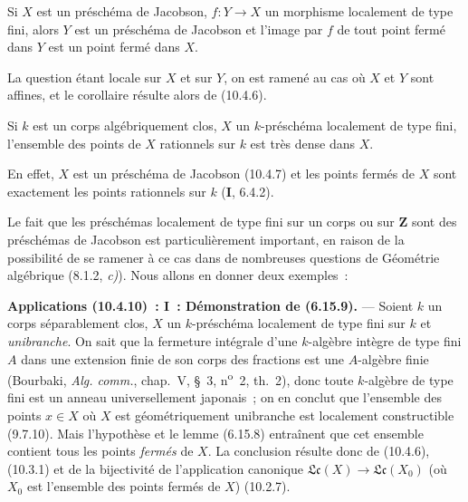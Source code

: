 \begin{corollary}[10.4.7]
\label{IV.10.4.7-fr}
Si $X$ est un préschéma de Jacobson, $f:Y\to X$ un morphisme localement de type
fini, alors $Y$ est un préschéma de Jacobson et l'image par $f$ de tout point
fermé dans $Y$ est un point fermé dans $X$.
\end{corollary}

La question étant locale sur $X$ et sur $Y$, on est ramené au cas où $X$ et
$Y$ sont affines, et le corollaire résulte alors de (10.4.6).

\begin{corollary}[10.4.8]
\label{IV.10.4.8-fr}
Si $k$ est un corps algébriquement clos, $X$ un $k$-préschéma localement de
type fini, l'ensemble des points de $X$ rationnels sur $k$ est très dense dans
$X$.
\end{corollary}

En effet, $X$ est un préschéma de Jacobson (10.4.7) et les points fermés de
$X$ sont exactement les points rationnels sur $k$ (\textbf{I}, 6.4.2).

\begin{env}[10.4.9]
\label{IV.10.4.9-fr}
Le fait que les préschémas localement de type fini sur un corps ou sur
$\mathbf Z$ sont des préschémas de Jacobson est particulièrement important,
en raison de la possibilité de se ramener à ce cas dans de nombreuses
questions de Géométrie algébrique (8.1.2, \emph{c)}). Nous allons en donner
deux exemples~:
\end{env}

\begin{env}[10.4.10]
\label{IV.10.4.10-fr}
\textbf{Applications (10.4.10)~: I~: Démonstration de (6.15.9).} --- Soient
$k$ un corps séparablement clos, $X$ un $k$-préschéma localement de type fini
sur $k$ et \emph{unibranche}. On sait que la fermeture intégrale d'une
$k$-algèbre intègre de type fini $A$ dans une extension finie de son corps des
fractions est une $A$-algèbre finie (Bourbaki, \emph{Alg. comm.}, chap.~V,
\S~3, n\textsuperscript{o}~2, th.~2), donc toute $k$-algèbre de type fini est
un anneau universellement japonais~; on en conclut que l'ensemble des points
$x\in X$ où $X$ est géométriquement unibranche est localement constructible
(9.7.10). Mais l'hypothèse et le lemme (6.15.8) entraînent que cet ensemble
contient tous les points \emph{fermés} de $X$. La conclusion résulte donc de
(10.4.6), (10.3.1) et de la bijectivité de l'application canonique
$\mathfrak{Lc}(X)\to\mathfrak{Lc}(X_0)$ (où $X_0$ est l'ensemble des points
fermés de $X$) (10.2.7).
\end{env}

